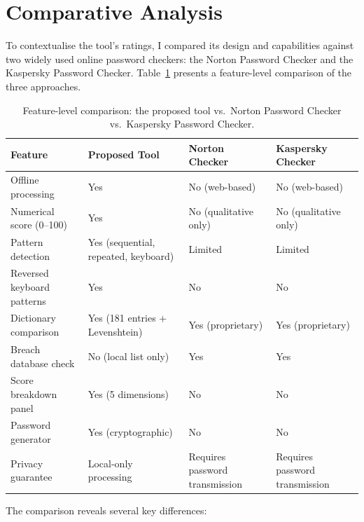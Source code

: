 \section{Comparative Analysis}

To contextualise the tool's ratings, I compared its design and capabilities against two widely used online password checkers: the Norton Password Checker and the Kaspersky Password Checker. Table~\ref{tab:comparative} presents a feature-level comparison of the three approaches.

\begin{table}[H]
\centering
\caption{Feature-level comparison: the proposed tool vs.\ Norton Password Checker vs.\ Kaspersky Password Checker.}
\label{tab:comparative}
\small
\begin{tabularx}{\textwidth}{>{\raggedright\arraybackslash}p{3.5cm} >{\centering\arraybackslash}p{2.5cm} >{\centering\arraybackslash}p{2.5cm} >{\centering\arraybackslash}p{2.5cm}}
\toprule
\textbf{Feature} & \textbf{Proposed Tool} & \textbf{Norton Checker} & \textbf{Kaspersky Checker} \\
\midrule
Offline processing & Yes & No (web-based) & No (web-based) \\
Numerical score (0--100) & Yes & No (qualitative only) & No (qualitative only) \\
Pattern detection & Yes (sequential, repeated, keyboard) & Limited & Limited \\
Reversed keyboard patterns & Yes & No & No \\
Dictionary comparison & Yes (181 entries + Levenshtein) & Yes (proprietary) & Yes (proprietary) \\
Breach database check & No (local list only) & Yes & Yes \\
Score breakdown panel & Yes (5 dimensions) & No & No \\
Password generator & Yes (cryptographic) & No & No \\
Privacy guarantee & Local-only processing & Requires password transmission & Requires password transmission \\
\bottomrule
\end{tabularx}
\end{table}

The comparison reveals several key differences:

